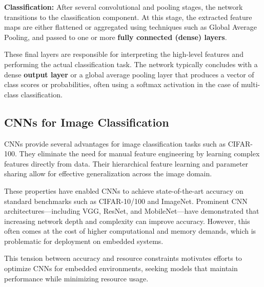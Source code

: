 \textbf{Classification:}
\newline
After several convolutional and pooling stages, the network transitions to the classification component. At this stage, the extracted feature maps are either flattened or aggregated using techniques such as Global Average Pooling, and passed to one or more \textbf{fully connected (dense) layers}.

These final layers are responsible for interpreting the high-level features and performing the actual classification task. The network typically concludes with a dense \textbf{output layer }or a global average pooling layer that produces a vector of class scores or probabilities, often using a softmax activation in the case of multi-class classification.


\subsection{CNNs for Image Classification}

CNNs provide several advantages for image classification tasks such as CIFAR-100. They eliminate the need for manual feature engineering by learning complex features directly from data. Their hierarchical feature learning and parameter sharing allow for effective generalization across the image domain.

These properties have enabled CNNs to achieve state-of-the-art accuracy on standard benchmarks such as CIFAR-10/100 and ImageNet. Prominent CNN architectures---including VGG, ResNet, and MobileNet---have demonstrated that increasing network depth and complexity can improve accuracy. However, this often comes at the cost of higher computational and memory demands, which is problematic for deployment on embedded systems.

This tension between accuracy and resource constraints motivates efforts to optimize CNNs for embedded environments, seeking models that maintain performance while minimizing resource usage.

